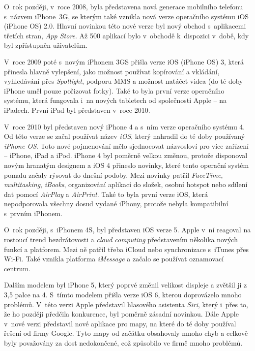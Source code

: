 O~rok později, v~roce 2008, byla představena nová generace mobilního telefonu s~názvem iPhone~3G, se kterým také vznikla nová verze operačního systému iOS (iPhone OS) 2.0. Hlavní novinkou této nové verze byl nový obchod s~aplikacemi třetích stran, \emph{App Store}. Až 500 aplikací bylo v~obchodě k~dispozici v~době, kdy byl zpřístupněn uživatelům.

V~roce 2009 poté s~novým iPhonem 3GS přišla verze iOS (iPhone OS) 3, která přinesla hlavně vylepšení, jako možnost používat kopírování a vkládání, vyhledávání přes \emph{Spotlight}, podporu MMS a možnost natáčet videa (do té doby iPhone uměl pouze pořizovat fotky). Také to byla první verze operačního systému, která fungovala i~na nových tabletech od společnosti Apple – na iPadech. První iPad byl představen v~roce 2010.

V~roce 2010 byl představen nový iPhone 4 a s~ním verze operačního systému 4. Od této verze se začal používat název \emph{iOS}, který nahradil do té doby používaný \emph{iPhone OS}. Toto nové pojmenování mělo sjednocovat názvosloví pro více zařízení – iPhone, iPad a iPod. iPhone 4 byl poměrně velkou změnou, protože disponoval novým hranatým designem a iOS 4 přineslo novinky, které tento operační systém pomalu začaly rýsovat do dnešní podoby. Mezi novinky patřil \emph{FaceTime}, \emph{multitasking}, \emph{iBooks}, organizování aplikací do složek, osobní hotspot nebo sdílení dat pomocí \emph{AirPlay} a \emph{AirPrint}. Také to byla první verze iOS, která nepodporovala všechny dosud vydané iPhony, protože nebyla kompatibilní s~prvním iPhonem.

O~rok později, s~iPhonem 4S, byl představen iOS verze 5. Apple v~ní reagoval na rostoucí trend bezdrátovosti a \emph{cloud computing} představením několika nových funkcí a platforem. Mezi ně patřil třeba iCloud nebo synchronizace s~iTunes přes Wi-Fi. Také vznikla platforma \emph{iMessage} a začalo se používat oznamovací centrum.

Dalším modelem byl iPhone 5, který poprvé změnil velikost displeje a zvětšil ji z 3,5 palce na 4. S~tímto modelem přišla verze iOS 6, kterou doprovázelo mnoho problémů. V~této verzi Apple představil hlasového asistenta \emph{Siri}, který i~přes to, že ho později předčila konkurence, byl poměrně zásadní novinkou. Dále Apple v~nové verzi představil nové aplikace pro mapy, na které do té doby používal řešení od firmy Google. Tyto mapy od začátku obsahovaly mnoho chyb a celkově byly považovány za dost nedokončené, což způsobilo ve firmě mnoho problémů.

